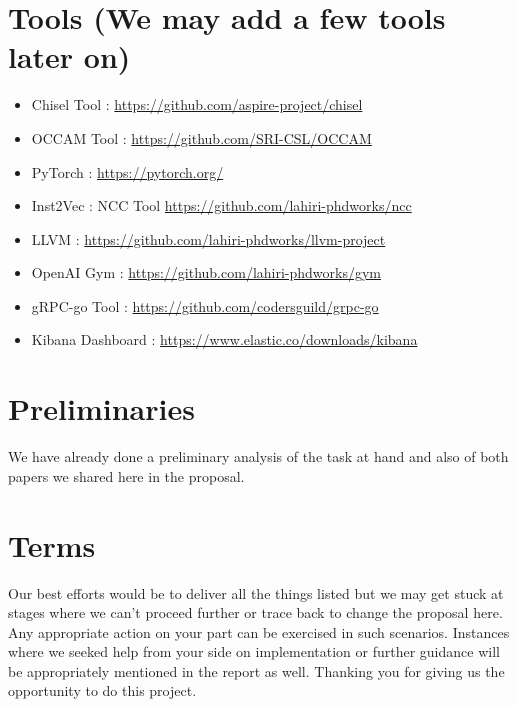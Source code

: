 \documentclass{article} %
\begin{document}
\section*{Tools (We may add a few tools later on)}
\begin{itemize}
    \item Chisel Tool : \url{https://github.com/aspire-project/chisel}
    \item OCCAM Tool : \url{https://github.com/SRI-CSL/OCCAM}
    \item PyTorch : \url{https://pytorch.org/}
    \item Inst2Vec : NCC Tool \url{https://github.com/lahiri-phdworks/ncc}
    \item LLVM : \url{https://github.com/lahiri-phdworks/llvm-project}
    \item OpenAI Gym : \url{https://github.com/lahiri-phdworks/gym}
    \item gRPC-go Tool : \url{https://github.com/codersguild/grpc-go}
    \item Kibana Dashboard : \url{https://www.elastic.co/downloads/kibana}
\end{itemize}

\section*{Preliminaries}
We have already done a preliminary analysis of the task at hand and also of both papers we shared here in the proposal. 

\section*{Terms}
Our best efforts would be to deliver all the things listed but we may get stuck at stages where we can't proceed further or trace back to change the proposal here. Any appropriate action on your part can be exercised in such scenarios. Instances where we seeked help from your side on implementation or further guidance will be appropriately mentioned in the report as well. Thanking you for giving us the opportunity to do this project.  
\end{document}
